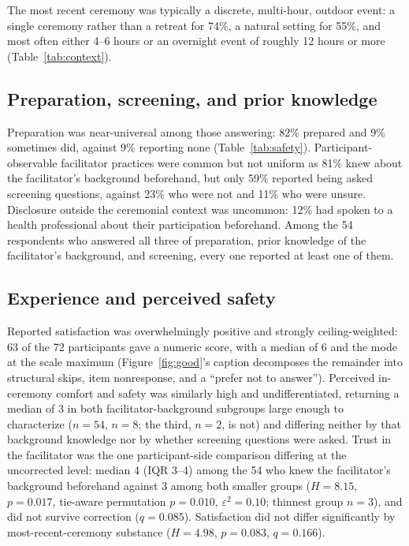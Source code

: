 \documentclass[12pt]{article}
\begin{document}
The most recent ceremony was typically a discrete, multi-hour, outdoor event: a single ceremony rather than
a retreat for 74\%, a natural setting for 55\%, and most often either 4--6 hours or an overnight event of
roughly 12 hours or more (Table~\ref{tab:context}).

\subsection{Preparation, screening, and prior knowledge}

Preparation was near-universal among those answering: 82\% prepared and 9\% sometimes did, against 9\%
reporting none (Table~\ref{tab:safety}). Participant-observable facilitator practices were common but not
uniform as 81\% knew about the facilitator's background beforehand, but only 59\% reported being asked
screening questions, against 23\% who were not and 11\% who were unsure. Disclosure outside the ceremonial
context was uncommon: 12\% had spoken to a health professional about their participation beforehand.
Among the 54 respondents who answered all three of preparation, prior knowledge of the
facilitator's background, and screening, every one reported at least one of them.

\subsection{Experience and perceived safety}

Reported satisfaction was overwhelmingly positive and strongly ceiling-weighted: 63 of the 72 participants
gave a numeric score, with a median of 6 and the mode at the scale maximum (Figure~\ref{fig:good}'s caption
decomposes the remainder into structural skips, item nonresponse, and a ``prefer not to answer'').
Perceived in-ceremony comfort and safety was similarly high and undifferentiated, returning a median of 3 in
both facilitator-background subgroups large enough to characterize ($n=54$, $n=8$; the third, $n=2$, is not)
and differing neither by that background knowledge nor by whether screening questions were asked. Trust in
the facilitator was the one participant-side comparison differing at the uncorrected level: median 4 (IQR
3--4) among the 54 who knew the facilitator's background beforehand against 3 among both smaller groups
($H=8.15$, $p=0.017$, tie-aware permutation $p=0.010$, $\varepsilon^2=0.10$; thinnest group $n=3$), and did
not survive correction ($q=0.085$). Satisfaction did not differ significantly by most-recent-ceremony
substance ($H=4.98$, $p=0.083$, $q=0.166$).
\end{document}
